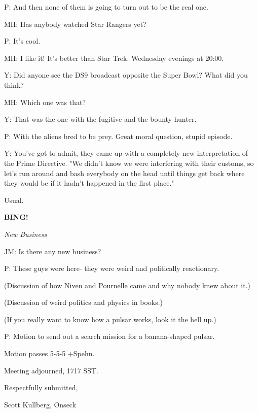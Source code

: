 \documentclass[12pt]{article}
\newcommand{\bing}{{\bf BING!} }
\newcommand{\goto}[1]{\bing \vskip 12pt \centerline{{\em{#1}}}}
\begin{document}
P: And then none of them is going to turn out to be the real one.

MH: Has anybody watched Star Rangers yet?

P: It's cool.

MH: I like it! It's better than Star Trek. Wednesday evenings at 20:00.

Y: Did anyone see the DS9 broadcast opposite the Super Bowl? What did you think?

MH: Which one was that?

Y: That was the one with the fugitive and the bounty hunter.

P: With the aliens bred to be prey. Great moral question, stupid episode.

Y: You've got to admit, they came up with a completely new interpretation of the Prime Directive. "We didn't know we were interfering with their customs, so let's run around and bash everybody on the head until things get back where they would be if it hadn't happened in the first place."

Usual.

\goto{New Business}

JM: Is there any new business?

P: These guys were here- they were weird and politically reactionary.

(Discussion of how Niven and Pournelle came and why nobody knew about it.)

(Discussion of weird politics and physics in books.)

(If you really want to know how a pulsar works, look it the hell up.)

P: Motion to send out a search mission for a banana-shaped pulsar.

Motion passes 5-5-5 +Spehn.

\vspace{12pt}

\noindent
Meeting adjourned, 1717 SST.

\vspace{18pt}

\centerline{Respectfully submitted,}
\centerline{Scott Kullberg, Onseck}
\end{document}
